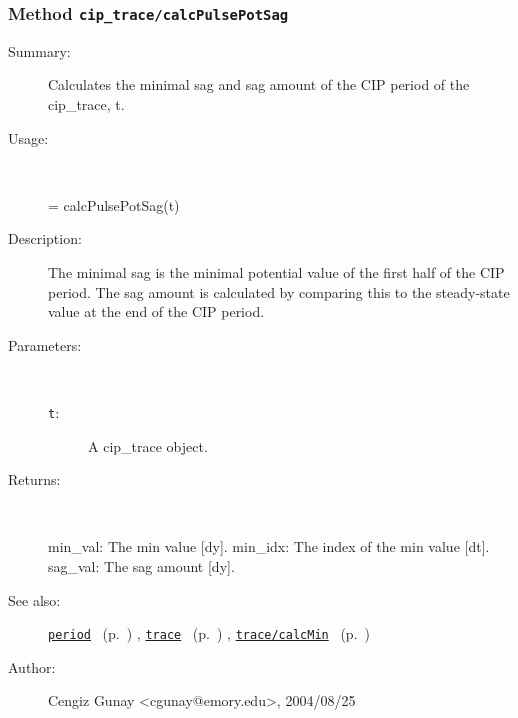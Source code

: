 \subsubsection[Method \texttt{calcPulsePotSag}]{Method \texttt{cip\_trace/calcPulsePotSag}}%
%
\label{ref_cip_trace__calcPulsePotSag}%
\hypertarget{ref_cip_trace__calcPulsePotSag}{}%
\begin{description}
\item[Summary:]Calculates the minimal sag and sag amount of the CIP period of the cip\_trace, t. 
%
\item[Usage:]~%
\begin{lyxcode}%
[min\_val, min\_idx, sag\_val] = calcPulsePotSag(t)
%
\end{lyxcode}%
%
\item[Description:]%
The minimal sag is the minimal potential value of the 
 first half of the CIP period. The sag amount is calculated by 
 comparing this to the steady-state value at the end of the CIP period.
\item[Parameters:]~
\begin{description}%
\item[\texttt{t}:]
 A cip\_trace object.
\end{description}%
%
\item[Returns:
]~

	min\_val: The min value [dy].
	min\_idx: The index of the min value [dt].
	sag\_val: The sag amount [dy].
%
%
\item[See also:]%
\hyperlink{ref_period}{\texttt{period}}%
\ (p.~\pageref{ref_period})%
%
, \hyperlink{ref_trace}{\texttt{trace}}%
\ (p.~\pageref{ref_trace})%
%
, \hyperlink{ref_trace__calcMin}{\texttt{trace/calcMin}}%
\ (p.~\pageref{ref_trace__calcMin})%
%
%
\item[Author:]%
Cengiz Gunay <cgunay@emory.edu>, 2004/08/25
%
\end{description}
\methodline%
